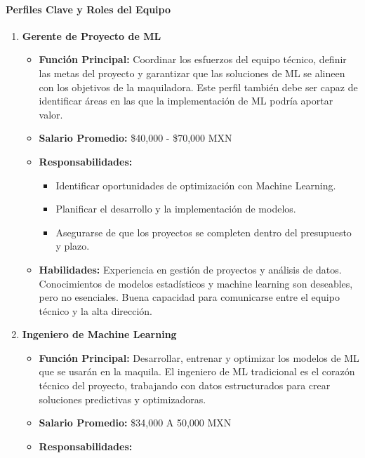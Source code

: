 \documentclass[
  10pt,
  letterpaper,
]{book}
\let\oldparagraph\paragraph
\renewcommand{\paragraph}[1]{\oldparagraph{#1}\mbox{}}
\providecommand{\tightlist}{%
  \setlength{\itemsep}{0pt}\setlength{\parskip}{0pt}}\usepackage{longtable,booktabs,array}
\begin{document}
\paragraph{\texorpdfstring{\textbf{Perfiles Clave y Roles del
Equipo}}{Perfiles Clave y Roles del Equipo}}\label{perfiles-clave-y-roles-del-equipo-1}

\begin{enumerate}
\def\labelenumi{\arabic{enumi}.}
\tightlist
\item
  \textbf{Gerente de Proyecto de ML}

  \begin{itemize}
  \tightlist
  \item
    \textbf{Función Principal:} Coordinar los esfuerzos del equipo
    técnico, definir las metas del proyecto y garantizar que las
    soluciones de ML se alineen con los objetivos de la maquiladora.
    Este perfil también debe ser capaz de identificar áreas en las que
    la implementación de ML podría aportar valor.
  \item
    \textbf{Salario Promedio:} \$40,000 - \$70,000 MXN
  \item
    \textbf{Responsabilidades:}

    \begin{itemize}
    \tightlist
    \item
      Identificar oportunidades de optimización con Machine Learning.
    \item
      Planificar el desarrollo y la implementación de modelos.
    \item
      Asegurarse de que los proyectos se completen dentro del
      presupuesto y plazo.
    \end{itemize}
  \item
    \textbf{Habilidades:} Experiencia en gestión de proyectos y análisis
    de datos. Conocimientos de modelos estadísticos y machine learning
    son deseables, pero no esenciales. Buena capacidad para comunicarse
    entre el equipo técnico y la alta dirección.
  \end{itemize}
\item
  \textbf{Ingeniero de Machine Learning}

  \begin{itemize}
  \tightlist
  \item
    \textbf{Función Principal:} Desarrollar, entrenar y optimizar los
    modelos de ML que se usarán en la maquila. El ingeniero de ML
    tradicional es el corazón técnico del proyecto, trabajando con datos
    estructurados para crear soluciones predictivas y optimizadoras.
  \item
    \textbf{Salario Promedio:} \$34,000 A 50,000 MXN
  \item
    \textbf{Responsabilidades:}


\end{itemize}
\end{enumerate}
\end{document}
